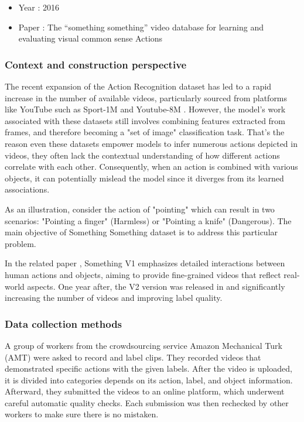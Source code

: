 \documentclass[10pt,onecolumn,letterpaper]{article}
\begin{document}
\begin{itemize}
	\item Year : 2016
	\item Paper : The “something something” video database for learning and evaluating visual common sense
	Actions \cite{somethingsomething}
\end{itemize}

\subsubsection{\textbf{Context and construction perspective}}

The recent expansion of the Action Recognition dataset has led to a rapid increase in the number of available videos, particularly sourced from platforms like YouTube such as Sport-1M \cite{Sports1M} and Youtube-8M \cite{YouTube8M}. However, the model's work associated with these datasets still involves combining features extracted from frames, and therefore becoming a "set of image" classification task. That's the reason even these datasets empower models to infer numerous actions depicted in videos, they often lack the contextual understanding of how different actions correlate with each other. Consequently, when an action is combined with various objects, it can potentially mislead the model since it diverges from its learned associations. 

As an illustration, consider the action of "pointing" which can result in two scenarios: "Pointing a finger" (Harmless) or "Pointing a knife" (Dangerous). The main objective of Something Something dataset is to address this particular problem.

In the related paper \cite{somethingsomething}, Something V1 emphasizes detailed interactions between human actions and objects, aiming to provide fine-grained videos that reflect real-world aspects. One year after, the V2 version was released in \cite{Somethingv2} and significantly increasing the number of videos and improving label quality.
\subsubsection{Data collection methods}
A group of workers from the crowdsourcing service Amazon Mechanical Turk (AMT) were asked to record and label clips. They recorded videos that demonstrated specific actions with the given labels. After the video is uploaded, it is divided into categories depends on its action, label, and object information. Afterward, they submitted the videos to an online platform, which underwent careful automatic quality checks. Each submission was then rechecked by other workers to make sure there is no mistaken.
\end{document}
